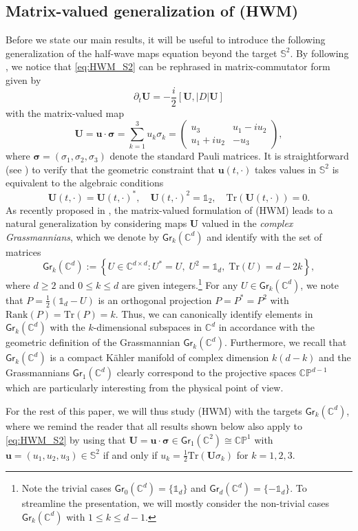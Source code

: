 \documentclass[10pt,reqno,a4paper]{amsart}
\theoremstyle{definition}
\theoremstyle{remark}
\theoremstyle{remark}
\numberwithin{equation}{section}
\newcommand{\C}{\mathbb{C}}
\newcommand{\Ss}{\mathbb{S}}
\newcommand{\rank}{\mathrm{Rank}}
\newcommand{\pt}{\partial}
\newcommand{\be}{\begin{equation}}
\newcommand{\ee}{\end{equation}}
\newcommand{\uu}{\mathbf{u}}
\newcommand{\Ub}{\mathbf{U}}
\newcommand{\Tr}{\mathrm{Tr}}
\newcommand{\Gr}{\mathsf{Gr}}
\begin{document}
\subsection{Matrix-valued generalization of (HWM)} 
Before we state our main results, it will be useful to introduce the following generalization of the half-wave maps equation beyond the target $\Ss^2$. By following \cite{GeLe-18}, we notice that \eqref{eq:HWM_S2} can be rephrased in matrix-commutator form given by
\be \label{eq:HWM} \tag{HWM}
\boxed{\pt_t \Ub = -\frac{i}{2} [\Ub, |D| \Ub]}
\ee
with the matrix-valued map 
$$
\Ub = \uu \cdot \bm{\sigma} = \sum_{k=1}^3 u_k \sigma_k = \left ( \begin{array}{cc} u_3 & u_1 - i u_2 \\ u_1 + i u_2 & -u_3 \end{array} \right ),
$$
where $\bm{\sigma} = (\sigma_1, \sigma_2, \sigma_3)$ denote the standard Pauli matrices. It is straightforward (see \cite{GeLe-18}) to verify that the geometric constraint that $\uu(t,\cdot)$ takes values in $\Ss^2$ is equivalent to the algebraic conditions 
$$
\Ub(t,\cdot) = \Ub(t, \cdot)^*, \quad \Ub(t,\cdot)^2 = \mathds{1}_2, \quad \Tr (\Ub(t,\cdot)) = 0.
$$ 
As recently proposed in \cite{GeLe-25}, the matrix-valued formulation of (HWM) leads to a natural generalization by considering maps $\Ub$ valued in the {\em complex Grassmannians}, which we denote by $\Gr_k(\C^d)$ and identify with the set of matrices
$$
\Gr_k(\C^d) := \left \{ U \in \C^{d \times d} : U^* = U, \; U^2 = \mathds{1}_d, \; \Tr (U) = d-2k \right \},
$$
where $d \geq 2$ and $0 \leq k \leq d$ are given integers.\footnote{Note the trivial cases $\Gr_0(\C^d) = \{ \mathds{1}_d \}$ and $\Gr_d(\C^d) = \{ -\mathds{1}_d \}$. To streamline the presentation, we will mostly consider  the non-trivial cases $\Gr_k(\C^d)$ with $1 \leq k \leq d-1$.} For any $U \in \Gr_k(\C^d)$, we note that $P= \frac{1}{2}(\mathds{1}_d- U)$ is an orthogonal projection $P=P^*=P^2$ with $\rank(P) = \Tr(P)=k$. Thus, we can canonically identify elements in $\Gr_k(\C^d)$ with the $k$-dimensional subspaces in $\C^d$ in accordance with the geometric definition of the Grassmannian $\Gr_k(\C^d)$. Furthermore, we recall that $\Gr_k(\C^d)$ is a compact K\"ahler manifold of complex dimension $k(d-k)$ and the Grassmannians $\Gr_1(\C^d)$ clearly correspond to the projective spaces $\mathbb{CP}^{d-1}$ which are particularly interesting from the physical point of view.  



For the rest of this paper, we will thus study (HWM) with the targets $\Gr_k(\C^d)$, where we remind the reader that all results shown below also apply to \eqref{eq:HWM_S2} by using that $\Ub = \uu \cdot \bm{\sigma} \in \Gr_1(\C^2)\cong \mathbb{CP}^1$ with $\uu = (u_1,u_2,u_3) \in \Ss^2$ if and only if $u_k = \frac{1}{2} \Tr(\Ub \sigma_k)$ for $k=1,2,3$.
\end{document}
